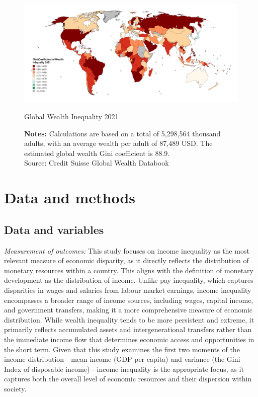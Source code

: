 \documentclass[12pt]{article}
\begin{document}
\begin{figure}[H]
\centering
\includegraphics[width=1\linewidth]{figs/global_wealth_distribution.png}
\caption{Global Wealth Inequality 2021}
\captionsetup{font=footnotesize}
\caption*{\textbf{Notes:} Calculations are based on a total of 5,298,564 thousand adults, with an average wealth per adult of 87,489 USD. The estimated global wealth Gini coefficient is 88.9.\\
Source: Credit Suisse Global Wealth Databook \parencite*{suisse2022global}}
\end{figure}

\section{Data and methods}

\subsection{Data and variables} \label{sec:data}

\textit{Measurement of outcomes:} This study focuses on income inequality as the most relevant measure of economic disparity, as it directly reflects the distribution of monetary resources within a country. This aligns with the definition of monetary development as the distribution of income. Unlike pay inequality, which captures disparities in wages and salaries from labour market earnings, income inequality encompasses a broader range of income sources, including wages, capital income, and government transfers, making it a more comprehensive measure of economic distribution. While wealth inequality tends to be more persistent and extreme, it primarily reflects accumulated assets and intergenerational transfers rather than the immediate income flow that determines economic access and opportunities in the short term. Given that this study examines the first two moments of the income distribution—mean income (GDP per capita) and variance (the Gini Index of disposable income)—income inequality is the appropriate focus, as it captures both the overall level of economic resources and their dispersion within society.  
\end{document}
